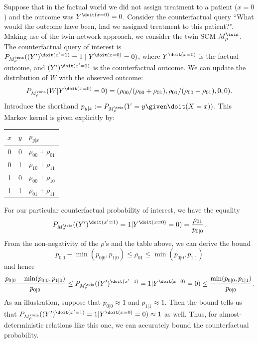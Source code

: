 \begin{Eg}
Suppose that in the factual world we did not assign treatment to a patient ($x=0$) and the outcome was $Y^{\doit(x=0)}=0$. 
Consider the counterfactual query ``What would the outcome have been, had we assigned treatment to this patient?''. 
Making use of the twin-network approach, we consider the twin SCM $M_{\rho}^{\twin}$.
The counterfactual query of interest is $P_{M_{\rho}^{\twin}}((Y')^{\doit(x'=1)}=1\mid Y^{\doit(x=0)}=0)$, where $Y^{\doit(x=0)}$ is the factual outcome, and
$(Y')^{\doit(x'=1)}$ is the counterfactual outcome. 
We can update the distribution of $W$ with the observed outcome:
  $$P_{M_{\rho}^{\twin}}(W | Y^{\doit(x=0)}=0) = (\rho_{00} / (\rho_{00} + \rho_{01}),\rho_{01} / (\rho_{00} + \rho_{01}),0,0).$$
Introduce the shorthand $p_{y|x} := P_{M_{\rho}^\twin}(Y=y\given \doit(X=x))$. This Markov kernel is given explicitly by:
  \begin{center}\begin{tabular}{ccl}
    $x$ & $y$ & $p_{y|x}$ \\
    \hline
    0   & 0   & $\rho_{00} + \rho_{01}$ \\ %
    0   & 1   & $\rho_{10} + \rho_{11}$ \\ %
    1   & 0   & $\rho_{00} + \rho_{10}$ \\ %
    1   & 1   & $\rho_{01} + \rho_{11}$ \\ %
  \end{tabular}\end{center}
For our particular counterfactual probability of interest, we have the equality
  $$P_{M_{\rho}^\twin}((Y')^{\doit(x'=1)} = 1 | Y^{\doit(x=0)}=0) = \frac{\rho_{01}}{p_{0|0}}.$$
From the non-negativity of the $\rho$'s and the table above, we can derive the bound
$$p_{0|0} - \min(p_{0|0},p_{1|0}) \le \rho_{01} \le \min(p_{0|0},p_{1|1})$$
and hence
$$\frac{p_{0|0} - \min(p_{0|0},p_{1|0})}{p_{0|0}} \le P_{M_{\rho}^\twin}((Y')^{\doit(x'=1)} = 1 | Y^{\doit(x=0)}=0) \le \frac{\min(p_{0|0},p_{1|1})}{p_{0|0}}.$$
As an illustration, suppose that $p_{0|0} \approx 1$ and $p_{1|1} \approx 1$.
Then the bound tells us that $P_{M_{\rho}^\twin}((Y')^{\doit(x'=1)} = 1 | Y^{\doit(x=0)}=0) \approx 1$ as well.
Thus, for almost-deterministic relations like this one, we can accurately bound the counterfactual probability.
\end{Eg}

